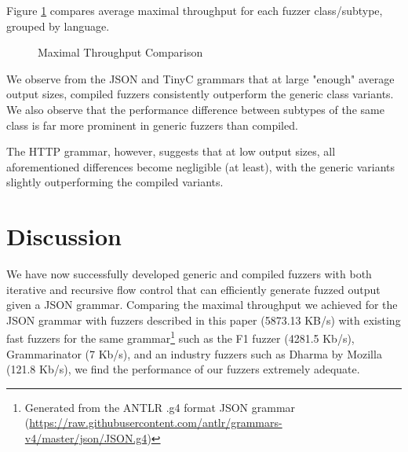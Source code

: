 \documentclass[8pt, twoside]{extarticle}
\begin{document}
Figure \ref{fig:maximal_throughput_comparison} compares average maximal throughput for each fuzzer class/subtype, grouped by language. 

\begin{figure}[hbt!]
	\centering
	
	\datatable

	
	\caption{Maximal Throughput Comparison}
	\label{fig:maximal_throughput_comparison}
\end{figure}

We observe from the JSON and TinyC grammars that at large "enough" average output sizes, compiled fuzzers consistently outperform the generic class variants. We also observe that the performance difference between subtypes of the same class is far more prominent in generic fuzzers than compiled. 

The HTTP grammar, however, suggests that at low output sizes, all aforementioned differences become negligible (at least), with the generic variants slightly outperforming the compiled variants. 

\section{Discussion}

We have now successfully developed generic and compiled fuzzers with both iterative and recursive flow control that can efficiently generate fuzzed output given a JSON grammar. Comparing the maximal throughput we achieved for the JSON grammar with fuzzers described in this paper (5873.13 KB/s) with existing fast fuzzers for the same grammar\footnote{Generated from the ANTLR .g4 format JSON grammar (\url{https://raw.githubusercontent.com/antlr/grammars-v4/master/json/JSON.g4})} such as the F1 fuzzer \cite{Gopinath_2019} (4281.5 Kb/s), Grammarinator \cite{Hodovan_2018} (7 Kb/s), and an industry fuzzers such as Dharma by Mozilla \cite{Diehl_2014} (121.8 Kb/s), we find the performance of our fuzzers extremely adequate.
\end{document}
